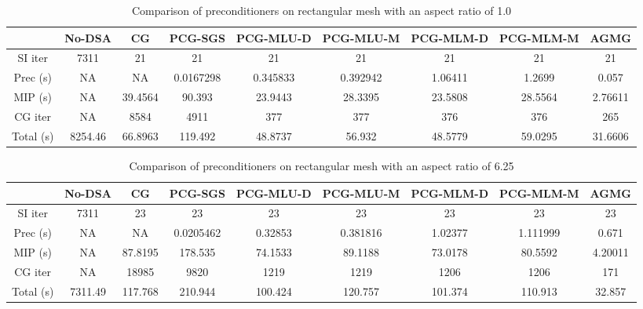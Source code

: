 \begin{landscape}
  \begin{center}
    \begin{table}[H]
      \caption{Comparison of preconditioners on rectangular mesh with an aspect ratio of 1.0}
      \begin{centering}
        \begin{tabular}{|c|c|c|c|c|c|c|c|c|}
          \hline
          & No-DSA & CG & PCG-SGS & PCG-MLU-D & PCG-MLU-M & PCG-MLM-D &
          PCG-MLM-M & AGMG \\
          \hline
          SI iter    & 7311    & 21      & 21        & 21       & 21       & 21      & 21      & 21      \\
          Prec (s)   & NA      & NA      & 0.0167298 & 0.345833 & 0.392942 & 1.06411 & 1.2699  & 0.057   \\
          MIP (s)    & NA      & 39.4564 & 90.393    & 23.9443  & 28.3395  & 23.5808 & 28.5564 & 2.76611 \\
          CG iter    & NA      & 8584    & 4911      & 377      & 377      & 376     & 376     & 265     \\
          Total (s)  & 8254.46 & 66.8963 & 119.492   & 48.8737  & 56.932   & 48.5779 & 59.0295 & 31.6606 \\
          \hline
        \end{tabular}
        \label{bld_ar_1}
      \end{centering}
    \end{table}
        \begin{table}[H]
      \caption{Comparison of preconditioners on rectangular mesh with an aspect ratio of 6.25}
      \begin{centering}
        \begin{tabular}{|c|c|c|c|c|c|c|c|c|}
          \hline
          & No-DSA & CG & PCG-SGS & PCG-MLU-D & PCG-MLU-M & PCG-MLM-D &
          PCG-MLM-M & AGMG \\
          \hline
          SI iter    & 7311    & 23      & 23        & 23      & 23       & 23      & 23       & 23      \\
          Prec (s)   & NA      & NA      & 0.0205462 & 0.32853 & 0.381816 & 1.02377 & 1.111999 & 0.671   \\
          MIP (s)    & NA      & 87.8195 & 178.535   & 74.1533 & 89.1188  & 73.0178 & 80.5592  & 4.20011 \\
          CG iter    & NA      & 18985   & 9820      & 1219    & 1219     & 1206    & 1206     & 171     \\
          Total (s)  & 7311.49 & 117.768 & 210.944   & 100.424 & 120.757  & 101.374 & 110.913  & 32.857  \\
          \hline
        \end{tabular}
        \label{bld_ar_6}
      \end{centering}
    \end{table}
  \end{center}
\end{landscape}
